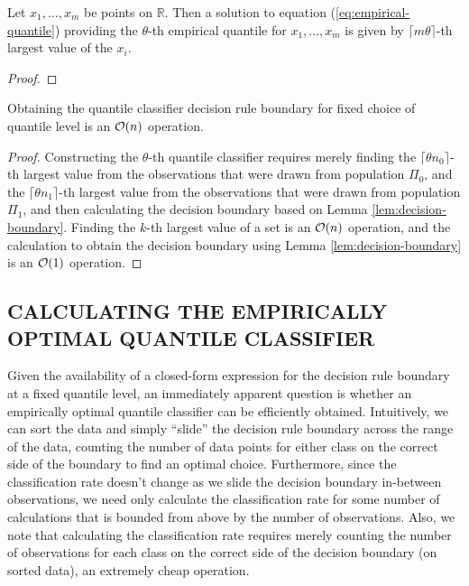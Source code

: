\begin{lemma}
  \label{lem:empirical-quantlev}
  Let $x_1, \dots, x_m$ be points on $\mathbb{R}$.  Then a solution to equation
  (\ref{eq:empirical-quantile}) providing the $\theta$-th empirical quantile for
  $x_1, \dots, x_m$ is given by $\lceil m \theta \rceil$-th largest value of the
  $x_i$.
\end{lemma}

\begin{proof}
  
\end{proof}

\begin{lemma}
  \label{lem:decision-rule-time}
  Obtaining the quantile classifier decision rule boundary for fixed choice of
  quantile level is an $\mathcal{O}(n)$ operation.
\end{lemma}

\begin{proof}
  Constructing the $\theta$-th quantile classifier requires merely finding the
  $\lceil \theta n_0 \rceil$-th largest value from the observations that were
  drawn from population $\Pi_0$, and the $\lceil \theta n_1 \rceil$-th largest
  value from the observations that were drawn from population $\Pi_1$, and then
  calculating the decision boundary based on Lemma \ref{lem:decision-boundary}.
  Finding the $k$-th largest value of a set is an $\mathcal{O}(n)$ operation, and the
  calculation to obtain the decision boundary using Lemma
  \ref{lem:decision-boundary} is an $\mathcal{O}(1)$ operation.
\end{proof}




\subsection{CALCULATING THE EMPIRICALLY OPTIMAL QUANTILE CLASSIFIER}
\label{sec:empirically-optimal-algo}

Given the availability of a closed-form expression for the decision rule
boundary at a fixed quantile level, an immediately apparent question is whether
an empirically optimal quantile classifier can be efficiently obtained.
Intuitively, we can sort the data and simply ``slide'' the decision rule
boundary across the range of the data, counting the number of data points for
either class on the correct side of the boundary to find an optimal choice.
Furthermore, since the classification rate doesn't change as we slide the
decision boundary in-between observations, we need only calculate the
classification rate for some number of calculations that is bounded from above
by the number of observations.  Also, we note that calculating the
classification rate requires merely counting the number of observations for each
class on the correct side of the decision boundary (on sorted data), an
extremely cheap operation.

